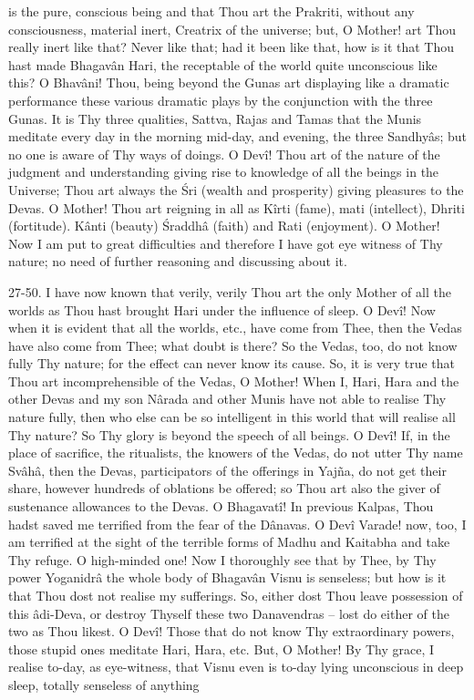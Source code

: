is the pure, conscious being and that Thou art the Prakriti, without any consciousness, material inert, Creatrix of the universe; but, O Mother! art Thou really inert like that? Never like that; had it been like that, how is it that Thou hast made Bhagav\^an Hari, the receptable of the world quite unconscious like this? O Bhav\^ani! Thou, being beyond the Gunas art displaying like a dramatic performance these various dramatic plays by the conjunction with the three Gunas. It is Thy three qualities, Sattva, Rajas and Tamas that the Munis meditate every day in the morning mid-day, and evening, the three Sandhy\^as; but no one is aware of Thy ways of doings. O Dev\^i! Thou art of the nature of the judgment and understanding giving rise to knowledge of all the beings in the Universe; Thou art always the \'Sri (wealth and prosperity) giving pleasures to the Devas. O Mother! Thou art reigning in all as K\^irti (fame), mati (intellect), Dhriti (fortitude). K\^anti (beauty) \'Sraddh\^a (faith) and Rati (enjoyment). O Mother! Now I am put to great difficulties and therefore I have got eye witness of Thy nature; no need of further reasoning and discussing about it.

27-50. I have now known that verily, verily Thou art the only Mother of all the worlds as Thou hast brought Hari under the influence of sleep. O Dev\^i! Now when it is evident that all the worlds, etc., have come from Thee, then the Vedas have also come from Thee; what doubt is there? So the Vedas, too, do not know fully Thy nature; for the effect can never know its cause. So, it is very true that Thou art incomprehensible of the Vedas, O Mother! When I, Hari, Hara and the other Devas and my son N\^arada and other Munis have not able to realise Thy nature fully, then who else can be so intelligent in this world that will realise all Thy nature? So Thy glory is beyond the speech of all beings. O Dev\^i! If, in the place of sacrifice, the ritualists, the knowers of the Vedas, do not utter Thy name Sv\^ah\^a, then the Devas, participators of the offerings in Yajña, do not get their share, however hundreds of oblations be offered; so Thou art also the giver of sustenance allowances to the Devas. O Bhagavat\^i! In previous Kalpas, Thou hadst saved me terrified from the fear of the D\^anavas. O Dev\^i Varade! now, too, I am terrified at the sight of the terrible forms of Madhu and Kaitabha and take Thy refuge. O high-minded one! Now I thoroughly see that by Thee, by Thy power Yoganidr\^a the whole body of Bhagav\^an Visnu is senseless; but how is it that Thou dost not realise my sufferings. So, either dost Thou leave possession of this \^adi-Deva, or destroy Thyself these two Danavendras -- lost do either of the two as Thou likest. O Dev\^i! Those that do not know Thy extraordinary powers, those stupid ones meditate Hari, Hara, etc. But, O Mother! By Thy grace, I realise to-day, as eye-witness, that Visnu even is to-day lying unconscious in deep sleep, totally senseless of anything

